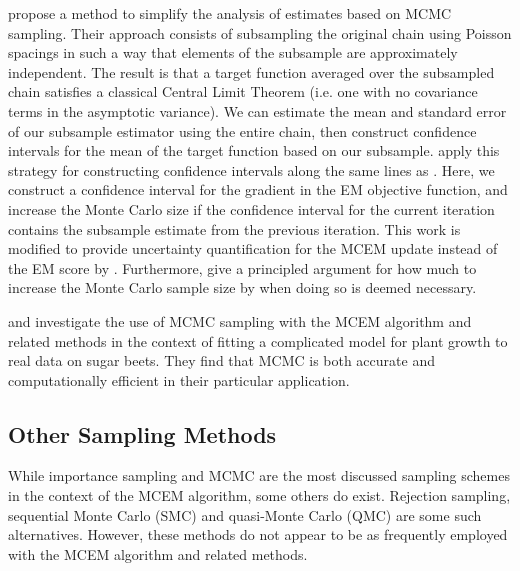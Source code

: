 \documentclass[11pt, oneside]{article}   	%
\begin{document}
\citet{Lev01} propose a method to simplify the analysis of estimates based on MCMC sampling. Their approach consists of subsampling the original chain using Poisson spacings in such a way that elements of the subsample are approximately independent. The result is that a target function averaged over the subsampled chain satisfies a classical Central Limit Theorem (i.e. one with no covariance terms in the asymptotic variance). We can estimate the mean and standard error of our subsample estimator using the entire chain, then construct confidence intervals for the mean of the target function based on our subsample. \citeauthor{Lev01} apply this strategy for constructing confidence intervals along the same lines as \citet{Boo99}. Here, we construct a confidence interval for the gradient in the EM objective function, and increase the Monte Carlo size if the confidence interval for the current iteration contains the subsample estimate from the previous iteration. This work is modified to provide uncertainty quantification for the MCEM update instead of the EM score by \citet{Lev04}. Furthermore, \citeauthor{Lev04} give a principled argument for how much to increase the Monte Carlo sample size by when doing so is deemed necessary.

\citet{Tre14} and \citet{Bae16} investigate the use of MCMC sampling with the MCEM algorithm and related methods in the context of fitting a complicated model for plant growth to real data on sugar beets. They find that MCMC is both accurate and computationally efficient in their particular application.


\subsection{Other Sampling Methods}

While importance sampling and MCMC are the most discussed sampling schemes in the context of the MCEM algorithm, some others do exist. Rejection sampling, sequential Monte Carlo (SMC) and quasi-Monte Carlo (QMC) are some such alternatives. However, these methods do not appear to be as frequently employed with the MCEM algorithm and related methods.
\end{document}
